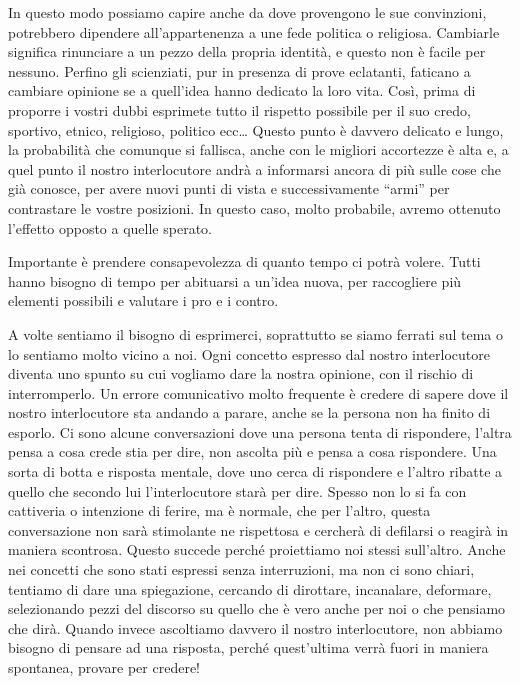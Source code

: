 \documentclass[12pt]{book} %
\begin{document}
In questo modo possiamo capire anche da dove provengono le sue convinzioni, potrebbero dipendere
all'appartenenza a une fede politica o religiosa. Cambiarle significa rinunciare a un pezzo della
propria identità, e questo non è facile per nessuno. Perfino gli scienziati, pur in presenza di prove eclatanti,
faticano a cambiare opinione se a quell'idea hanno dedicato la loro vita. Così, prima di proporre
i vostri dubbi esprimete tutto il rispetto possibile per il suo credo, sportivo, etnico, religioso, politico ecc…
Questo punto è davvero delicato e lungo, la probabilità che comunque si fallisca, anche con le migliori accortezze è
alta e, a quel punto il nostro interlocutore andrà a informarsi ancora di più sulle cose che già conosce, per avere
nuovi punti di vista e successivamente “armi” per contrastare le vostre posizioni. In questo caso, molto probabile,
avremo ottenuto l'effetto opposto a quelle sperato.

Importante è prendere consapevolezza di quanto tempo ci potrà volere. Tutti hanno bisogno di tempo per abituarsi a
un'idea nuova, per raccogliere più elementi possibili e valutare i pro e i
contro.


\bigskip

A volte sentiamo il bisogno di esprimerci, soprattutto se siamo ferrati sul tema o lo sentiamo molto vicino a noi. Ogni
concetto espresso dal nostro interlocutore diventa uno spunto su cui vogliamo dare la nostra opinione, con il rischio
di interromperlo. Un errore comunicativo molto frequente è credere di sapere dove il nostro interlocutore sta andando a
parare, anche se la persona non ha finito di esporlo. Ci sono alcune conversazioni dove una persona tenta di
rispondere, l'altra pensa a cosa crede stia per dire, non ascolta più e pensa a cosa rispondere.
Una sorta di botta e risposta mentale, dove uno cerca di rispondere e l'altro ribatte a quello che
secondo lui l'interlocutore starà per dire. Spesso non lo si fa con cattiveria o intenzione di
ferire, ma è normale, che per l'altro, questa conversazione non sarà stimolante ne rispettosa e
cercherà di defilarsi o reagirà in maniera scontrosa. Questo succede perché proiettiamo noi stessi
sull'altro. Anche nei concetti che sono stati espressi senza interruzioni, ma non ci sono chiari,
tentiamo di dare una spiegazione, cercando di dirottare, incanalare, deformare, selezionando pezzi del discorso su
quello che è vero anche per noi o che pensiamo che dirà. Quando invece ascoltiamo davvero il nostro interlocutore, non
abbiamo bisogno di pensare ad una risposta, perché quest'ultima verrà fuori in maniera spontanea,
provare per credere!
\end{document}
